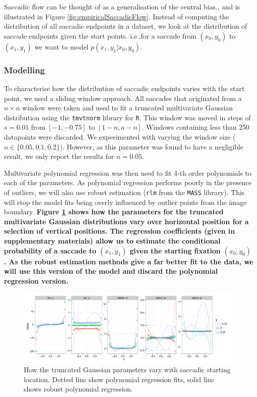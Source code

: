 \documentclass[a4paper, twocolumn, oneside, 11pt]{article}
\begin{document}
Saccadic flow can be thought of as a generalisation of the central bias., and is illustrated in Figure \ref{fig:empiricalSaccadicFlow}. Instead of computing the distribution of all saccadic endpoints in a dataset, we look at the distribution of saccade endpoints given the start points. i.e.,for a saccade from $(x_0, y_0)$ to $(x_1, y_1)$ we want to model $p(x_1,y_1|x_0, y_0)$.

\subsubsection{Modelling}

To characterise how the distribution of saccadic endpoints varies with the start point, we used a sliding window approach. All saccades that originated from a $n\times n$ window were taken and used to fit a truncated multivariate Gaussian distribution using the \texttt{tmvtnorm} library for \texttt{R}. This window was moved in steps of $s=0.01$ from $[-1,-0.75]$ to $[1-n, a-n]$. Windows containing less than 250 datapoints were discarded. We experimented with varying the window size ($n\in\{0.05,0.1, 0.2\}$). However, as this parameter was found to have a negligible result, we only report the results for $n=0.05$.

Multivariate polynomial regression was then used to fit 4-th order polynomials to each of the parameters. As polynomial regression performs poorly in the presence of outliers, we will also use robust estimation (\texttt{rlm} from the \texttt{MASS} library). This will stop the model fits being overly influenced by outlier points from the image boundary. \textbf{Figure \ref{fig:nParamsOverSpace} shows how the parameters for the truncated multivariate Gaussian distributions vary over horizontal position for a selection of vertical positions. The regression coefficients (given in supplementary materials) allow us to estimate the conditional probability of a saccade to $(x_1, y_1)$ given the starting fixation $(x_0, y_0)$. As the robust estimation methods give a far better fit to the data, we will use this version of the model and discard the polynomial regression version.}

\begin{figure}[ht]
\centering
\includegraphics[width=13cm]{../scripts/flow/figs/NparamsChagingOverSpace_ALL_tN}
\caption{How the truncated Gaussian parameters vary with saccadic starting location. Dotted line show polynomial regression fits, solid line shows robust polynomial regression.}
\label{fig:nParamsOverSpace}
\end{figure}
\end{document}
